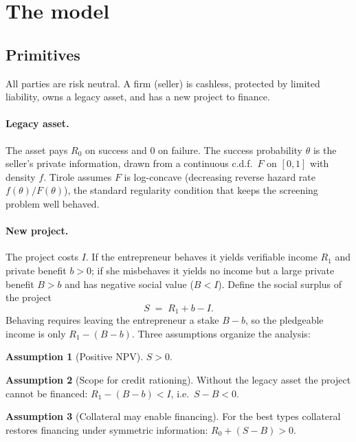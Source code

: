\documentclass[11pt]{article}
\theoremstyle{definition}
\newtheorem{assumption}{Assumption}
\theoremstyle{plain}
\begin{document}
\section{The model}
\label{section1}
\subsection{Primitives}

All parties are risk neutral. A firm (seller) is cashless, protected by
limited liability, owns a legacy asset, and has a new project to
finance.

\paragraph{Legacy asset.} The asset pays $R_0$ on success and $0$ on failure.
The success probability $\theta$ is the seller's private information, drawn from
a continuous c.d.f.\ $F$ on $[0,1]$ with density $f$. Tirole assumes $F$ is
log-concave (decreasing reverse hazard rate $f(\theta)/F(\theta)$), the
standard regularity condition that keeps the screening problem well behaved.

\paragraph{New project.} The project costs $I$. If the entrepreneur
behaves it yields verifiable income $R_1$ and private benefit $b>0$; if
she misbehaves it yields no income but a large private benefit $B>b$ and
has negative social value ($B<I$). Define the social surplus of the project
\[
S \;=\; R_1 + b - I .
\]
Behaving requires leaving the entrepreneur a stake $B-b$, so the
pledgeable income is only $R_1-(B-b)$. Three assumptions organize the
analysis:

\begin{assumption}[Positive NPV]
$S>0$.
\end{assumption}

\begin{assumption}[Scope for credit rationing]
Without the legacy asset the project cannot be financed:
$R_1-(B-b)<I$, i.e.\ $S-B<0$.
\end{assumption}

\begin{assumption}[Collateral may enable financing]
For the best types collateral restores financing under symmetric information:
$R_0+(S-B)>0$.
\end{assumption}
\end{document}
